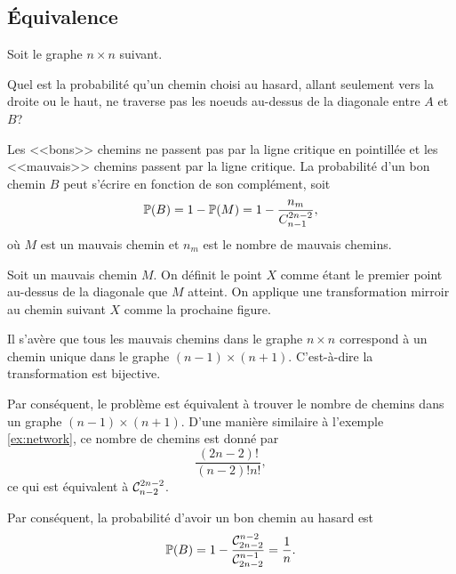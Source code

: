\documentclass[11pt]{article}
\newcommand\comb[2]{%
	\ensuremath{%
		\mathcal{C}_{#2}^{#1}%
	}%
}%
\renewcommand\P{%
	\ensuremath{%
		\mathbb{P}%
	}%
}%
\begin{document}
\subsection{Équivalence}
\begin{exemple}\label{ex:network_broken}
	Soit le graphe $n\times n$ suivant.
	\begin{figure}[H]
		\vspace{-3mm}
		\centering
		
		\vspace{-3mm}
	\end{figure}

	Quel est la probabilité qu'un chemin choisi au hasard, allant seulement
	vers la droite ou le haut, ne traverse pas les noeuds au-dessus de la
	diagonale entre $A$ et $B$?

	Les <<bons>> chemins ne passent pas par la ligne critique en pointillée et
	les <<mauvais>> chemins passent par la ligne critique. La probabilité d'un
	bon chemin $B$ peut s'écrire en fonction de son complément, soit
	\begin{equation*}
		\P(B)=1-\P(M)=1-\frac{n_m}{C_{n-1}^{2n-2}},
	\end{equation*}
	où $M$ est un mauvais chemin et $n_m$ est le nombre de mauvais chemins.

	Soit un mauvais chemin $M$. On définit le point $X$ comme étant le premier
	point au-dessus de la diagonale que $M$ atteint. On applique une
	transformation mirroir au chemin suivant $X$ comme la prochaine figure.

	\noindent
	\begin{minipage}{0.5\textwidth}
		\begin{figure}[H]
			\centering
			
		\end{figure}
	\end{minipage}%
	\begin{minipage}{0.5\textwidth}
		\begin{figure}[H]
			\centering
			
		\end{figure}
	\end{minipage}
\end{exemple}
\addtocounter{exemple}{-1}
\begin{exemple}[suite]
	Il s'avère que tous les mauvais chemins dans le graphe $n\times n$
	correspond à un chemin unique dans le graphe $(n-1)\times(n+1)$.
	C'est-à-dire la transformation est bijective.
	
	Par conséquent, le problème est équivalent à trouver le nombre de chemins
	dans un graphe $(n-1)\times(n+1)$. D'une manière similaire à l'exemple
	\ref{ex:network}, ce nombre de chemins est donné par
	\begin{equation*}
		\frac{(2n-2)!}{(n-2)!n!},
	\end{equation*}
	ce qui est équivalent à $\comb{2n-2}{n-2}$.

	Par conséquent, la probabilité d'avoir un bon chemin au hasard est
	\begin{equation*}
		\P(B)
		=1-\frac{\comb{n-2}{2n-2}}{\comb{n-1}{2n-2}}
		=\frac{1}{n}.
	\end{equation*}
\end{exemple}
\end{document}
